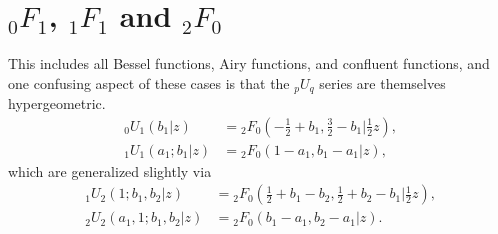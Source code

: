 \documentclass[12pt]{article}
\numberwithin{equation}{section}
\newcommand{\FFf}[5] {{}_{#1}{#2}_{#3} \left(#4 | {#5} \right)}
\begin{document}
\section{${}_0 F_1$, ${}_1 F_1$ and ${}_2 F_0$} This includes all Bessel functions, Airy functions, and confluent functions, and one confusing aspect of these cases is that the ${}_p U_{q}$ series are themselves hypergeometric.
\begin{align*}
\FFf{0}{U}{1}{b_1}{z} &= \FFf{2}{F}{0}{-\tfrac{1}{2}+b_1, \tfrac{3}{2}-b_1}{\tfrac{1}{2}z}\text{,}\\
\FFf{1}{U}{1}{a_1;b_1}{z} &= \FFf{2}{F}{0}{1-a_1, b_1-a_1}{z}\text{,}
\end{align*}
which are generalized slightly via
\begin{equation}
\label{equ_pUq_as_hyp}
\begin{alignedat}{5}
\FFf{1}{U}{2}{1;b_1,b_2}{z} &= \FFf{2}{F}{0}{\tfrac{1}{2}+b_1-b_2, \tfrac{1}{2}+b_2-b_1}{\tfrac{1}{2}z}\text{,}\\
\FFf{2}{U}{2}{a_1,1;b_1,b_2}{z} &= \FFf{2}{F}{0}{b_1-a_1, b_2-a_1}{z}\text{.}
\end{alignedat}
\end{equation}
\end{document}
